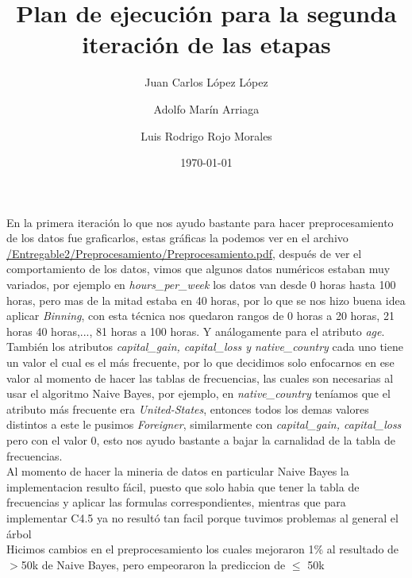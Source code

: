 \documentclass{article}
\title{Plan	de	ejecución para	la	segunda	iteración	de	las	etapas}
\author{Juan Carlos López López \and Adolfo Marín Arriaga \and Luis Rodrigo Rojo Morales}
\date{\today\\}
\begin{document}
 \maketitle
 En la primera iteración lo que nos ayudo bastante para hacer preprocesamiento de los datos fue graficarlos, estas gráficas la podemos ver en el archivo \href{https://github.com/rodrigorojo/ProyectoFinalMineria/blob/master/Entregable2/Preprocesamiento/Preprocesamiento.pdf} {/Entregable2/Preprocesamiento/Preprocesamiento.pdf}, después de ver el comportamiento de los datos, vimos que algunos datos numéricos estaban muy variados, por ejemplo en {\it hours\_per\_week} los datos van desde 0 horas hasta 100 horas, pero mas de la mitad estaba en 40 horas, por lo que se nos hizo buena idea aplicar {\it Binning}, con esta técnica nos quedaron rangos de 0 horas a 20 horas, 21 horas 40 horas,..., 81 horas a 100 horas. Y análogamente para el atributo {\it age}.\\

 También los atributos {\it capital\_gain, capital\_loss y native\_country} cada uno tiene un valor el cual es el más frecuente, por lo que decidimos solo enfocarnos en ese valor al momento de hacer las tablas de frecuencias, las cuales son necesarias al usar el algoritmo Naive Bayes, por ejemplo, en {\it native\_country} teníamos que el atributo más frecuente era {\it United-States}, entonces todos los demas valores distintos a este le pusimos {\it Foreigner}, similarmente con {\it capital\_gain, capital\_loss} pero con el valor 0, esto nos ayudo bastante a bajar la carnalidad de la tabla de frecuencias.\\

 Al momento de hacer la mineria de datos en particular Naive Bayes la implementacion resulto fácil, puesto que solo habia que tener la tabla de frecuencias y aplicar las formulas correspondientes, mientras que para implementar C4.5 ya no resultó tan facil porque tuvimos problemas al general el árbol\\

 Hicimos cambios en el preprocesamiento los cuales mejoraron 1\% al resultado de $>$50k de Naive Bayes, pero empeoraron la prediccion de $\leq$ 50k
\end{document}

